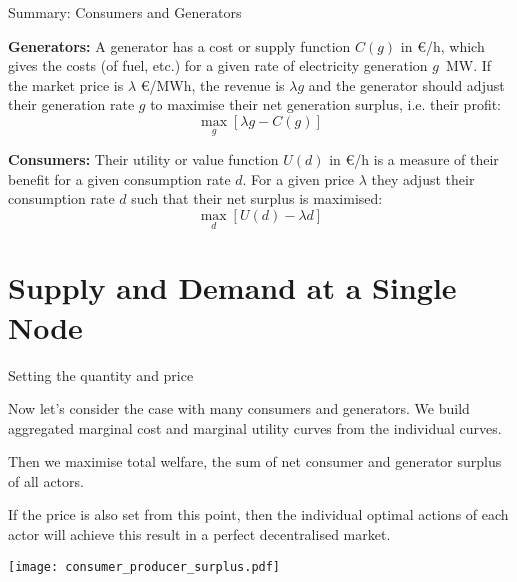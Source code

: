 \documentclass[10pt,aspectratio=169,dvipsnames]{beamer}
\def\l{\lambda}
\begin{document}
\begin{frame}{Summary: Consumers and Generators}

{\bf Generators:}  A generator has a \alert{cost} or \alert{supply function} $C(g)$ in \euro/h, which
  gives the costs (of fuel, etc.) for a given rate of electricity
  generation $g$~MW. If the market price is $\lambda$ \euro/MWh, the revenue is $\l g$ and the generator should adjust their
generation rate $g$ to maximise their \alert{net generation surplus}, i.e. their profit:
  \begin{equation*}
    \max_g \left[ \l g - C(g) \right]
  \end{equation*}


{\bf Consumers:} Their \alert{utility} or \alert{value function} $U(d)$ in \euro/h is a
  measure of their benefit for a given consumption rate $d$. For a given price $\lambda$ they adjust their consumption rate $d$ such that their \alert{net surplus} is maximised:
    \begin{equation*}
    \max_d \left[U(d) - \l d \right]
  \end{equation*}

  \end{frame}

\section{Supply and Demand at a Single Node}


\begin{frame}{Setting the quantity and price}

  Now let's consider the case with \alert{many} consumers and generators.  We build \alert{aggregated} marginal cost and marginal utility
  curves from the individual curves.

  Then we maximise \alert{total welfare}, the sum of net consumer and generator surplus of all actors.

  If the price is also set from this point, then the individual
  optimal actions of each actor will achieve this result in a perfect
  decentralised market.

  \centering
  \texttt{[image: consumer\_producer\_surplus.pdf]}




\end{frame}
\end{document}
